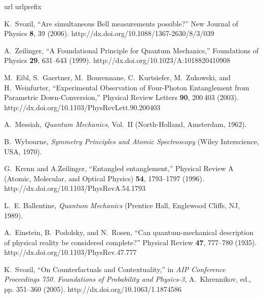 \documentclass[pra,amsfonts,showpacs,preprint,showkeys]{revtex4}
\begin{document}
\begin{thebibliography}{10}
\newcommand{\enquote}[1]{``#1''}
\expandafter\ifx\csname url\endcsname\relax
  \def\url#1{{#1}}\fi
\expandafter\ifx\csname urlprefix\endcsname\relax\def\urlprefix{}\fi

K.~Svozil, \enquote{Are simultaneous Bell measurements possible?} New Journal
  of Physics {\bf 8}, 39 (2006).
\newline http://dx.doi.org/10.1088/1367-2630/8/3/039

A.~Zeilinger, \enquote{A Foundational Principle for Quantum Mechanics,}
  Foundations of Physics {\bf 29}, 631--643 (1999).
\newline http://dx.doi.org/10.1023/A:1018820410908

M.~Eibl, S.~Gaertner, M.~Bourennane, C.~Kurtsiefer, M.~Zukowski, and
  H.~Weinfurter, \enquote{Experimental Observation of Four-Photon Entanglement
  from Parametric Down-Conversion,} Physical Review Letters {\bf 90}, 200\,403
  (2003).
\newline http://dx.doi.org/10.1103/PhysRevLett.90.200403

A.~Messiah, {\em Quantum Mechanics\/}, Vol.~II (North-Holland, Amsterdam,
  1962).

B.~Wybourne, {\em Symmetry Principles and Atomic Spectroscopy\/} (Wiley
  Interscience, USA, 1970).

G.~Krenn and A.Zeilinger, \enquote{Entangled entanglement,} Physical Review A
  (Atomic, Molecular, and Optical Physics) {\bf 54}, 1793--1797 (1996).
\newline http://dx.doi.org/10.1103/PhysRevA.54.1793

L.~E. Ballentine, {\em Quantum Mechanics\/} (Prentice Hall, Englewood Cliffs,
  NJ, 1989).

A.~Einstein, B.~Podolsky, and N.~Rosen, \enquote{Can quantum-mechanical
  description of physical reality be considered complete?} Physical Review {\bf
  47}, 777--780 (1935).
\newline http://dx.doi.org/10.1103/PhysRev.47.777

K.~Svozil, \enquote{On Counterfactuals and Contextuality,} in {\em AIP
  Conference Proceedings 750. {F}oundations of Probability and Physics-3\/},
  A.~Khrennikov, ed.,  pp. 351--360 (2005).
\newline http://dx.doi.org/10.1063/1.1874586


\end{thebibliography}
\end{document}
